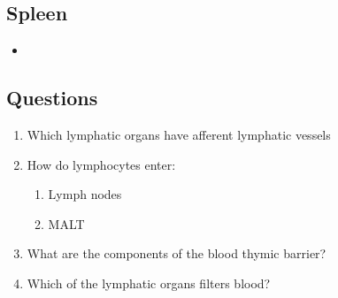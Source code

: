\begin{itemize}
  \subsection{Spleen}\label{Spleen}
  \begin{multicols}{2}
  \begin{itemize}
    \item 
  \end{itemize}
  \end{multicols}

  \subsection{Questions}\label{Questions}
  \begin{enumerate}
    \item Which lymphatic organs have afferent lymphatic vessels
    \item How do lymphocytes enter:
      \begin{enumerate}
        \item Lymph nodes
        \item MALT
      \end{enumerate}
    \item What are the components of the blood thymic barrier?
    \item Which of the lymphatic organs filters blood?
  \end{enumerate}
  
\end{itemize}

\newpage
